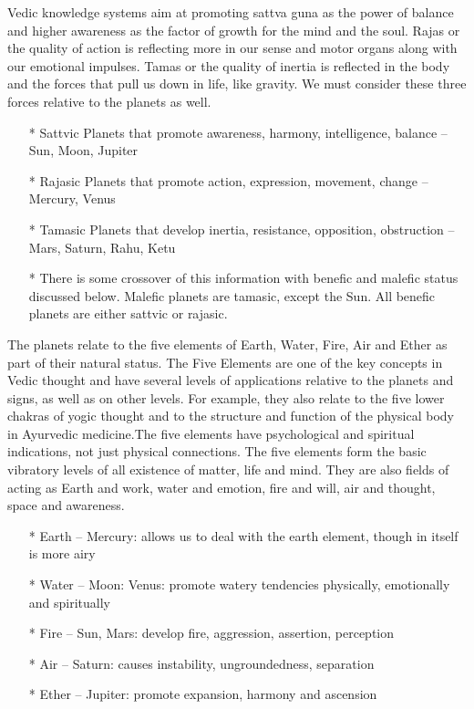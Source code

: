  

Vedic knowledge systems aim at promoting sattva guna as the power of balance and higher awareness as the factor of growth for the mind and the soul. Rajas or the quality of action is reflecting more in our sense and motor organs along with our emotional impulses. Tamas or the quality of inertia is reflected in the body and the forces that pull us down in life, like gravity. We must consider these three forces relative to the planets as well.

\begin{enumerate}
\item[*] Sattvic Planets that promote awareness, harmony, intelligence, balance – Sun, Moon, Jupiter
\item[*] Rajasic Planets that promote action, expression, movement, change  – Mercury, Venus
\item[*] Tamasic Planets that develop inertia, resistance, opposition, obstruction – Mars, Saturn, Rahu, Ketu
\item[*] There is some crossover of this information with  benefic and malefic status discussed below. Malefic planets are tamasic, except the Sun. All benefic planets are either sattvic or rajasic.
\end{enumerate}
 


 

The planets relate to the five elements of Earth, Water, Fire, Air and Ether as part of their natural status. The Five Elements are one of the key concepts in Vedic thought and have several levels of applications relative to the planets and signs, as well as on other levels. For example, they also relate to the five lower chakras of yogic thought and to the structure and function of the physical body in Ayurvedic medicine.The five elements have psychological and spiritual indications, not just physical connections. The five elements form the basic vibratory levels of all existence of matter, life and mind. They are also fields of acting as Earth and work, water and emotion, fire and will, air and thought, space and awareness.

 

\begin{enumerate}
\item[*] Earth – Mercury: allows us to deal with the earth element, though in itself is more airy
\item[*] Water – Moon: Venus: promote watery tendencies physically, emotionally and spiritually
\item[*] Fire – Sun, Mars: develop fire, aggression, assertion, perception
\item[*] Air – Saturn: causes instability, ungroundedness, separation
\item[*] Ether – Jupiter: promote expansion, harmony and ascension
 \end{enumerate}

